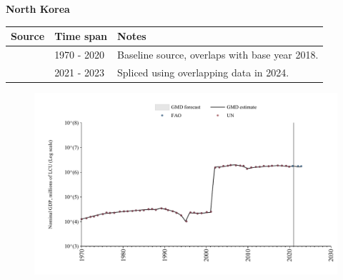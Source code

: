 \documentclass[12pt,a4paper,landscape]{article}
\begin{document}
\begin{adjustbox}{max totalsize={\paperwidth}{\paperheight},center}
\begin{minipage}[t][\textheight][t]{\textwidth}
\vspace*{0.5cm}
{}
\begin{center}
{\Large\bfseries North Korea}
\end{center}
\vspace{0.5cm}
\begin{table}[H]
\centering
\small
\begin{tabular}{|l|l|l|}
\hline
\textbf{Source} & \textbf{Time span} & \textbf{Notes} \\
\hline
\rowcolor{white}\cite{UN}& 1970 - 2020 &Baseline source, overlaps with base year 2018.\\
\rowcolor{lightgray}\cite{FAO}& 2021 - 2023 &Spliced using overlapping data in 2024.\\
\hline
\end{tabular}
\end{table}
\begin{figure}[H]
\centering
\includegraphics[width=\textwidth,height=0.6\textheight,keepaspectratio]{graphs/PRK_nGDP.pdf}
\end{figure}
\end{minipage}
\end{adjustbox}
\end{document}
